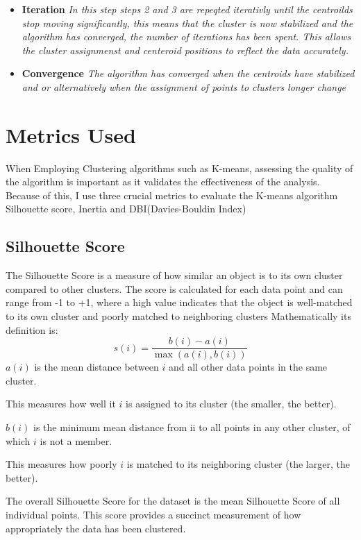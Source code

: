 \begin{itemize}
{    in cluste $i$}
    \item \textbf{Iteration}
    \textit{ In this step steps 2 and 3 are repeqted iterativly until the centroilds stop moving significantly, this means
    that the cluster is now stabilized and the algorithm has converged, the number of iterations has been spent. This allows
    the cluster assignmenst and centeroid positions to reflect the data accurately.}
    \item \textbf{Convergence}
    \textit{The algorithm has converged when the centroids have stabilized and or alternatively when the assignment of points to clusters
    longer change }
\end{itemize}

\section{Metrics Used}\label{sec:metrics-used}

When Employing Clustering algorithms such as K-means, assessing the quality of the algorithm is important as it validates
the effectiveness of the analysis.
Because of this, I use three crucial metrics to evaluate the K-means algorithm Silhouette score, Inertia and DBI(Davies-Bouldin Index)

\subsection{Silhouette Score}\label{subsec:silhouette-score}

The Silhouette Score is a measure of how similar an object is to its own cluster compared to other clusters.
The score is calculated for each data point and can range from -1 to +1, where a high value indicates that the object is
well-matched to its own cluster and poorly matched to neighboring clusters
Mathematically its definition is:
\[
    s(i) = \frac{b(i) - a(i)}{\max(a(i), b(i))}
\]
    $a(i)$ is the mean distance between $i$ and all other data points in the same cluster.

    This measures how well it $i$ is assigned to its cluster (the smaller, the better).

    $b(i)$ is the minimum mean distance from ii to all points in any other cluster, of which $i$ is not a member.

    This measures how poorly $i$ is matched to its neighboring cluster (the larger, the better).

The overall Silhouette Score for the dataset is the mean Silhouette Score of all individual points.
    This score provides a succinct measurement of how appropriately the data has been clustered.

